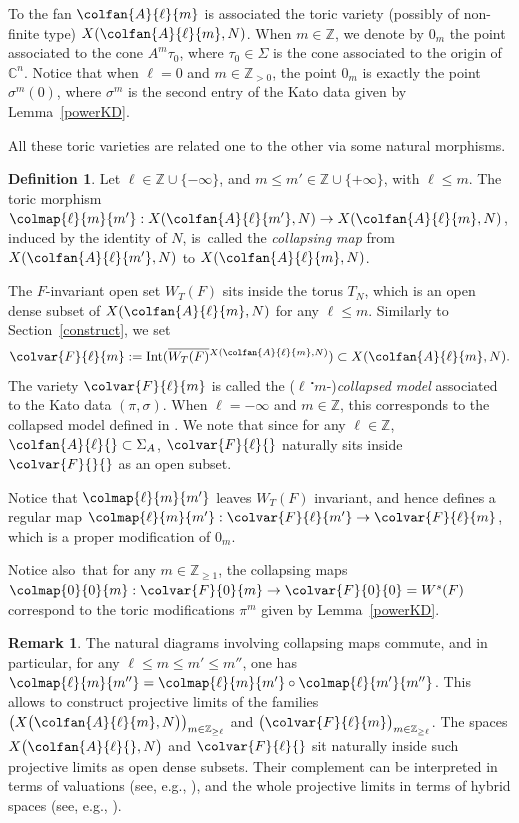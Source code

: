 \documentclass[JEP,XML,SOM,Unicode,NoFloatCountersInSection]{cedram}
\theoremstyle{definition}
\newtheorem{definition}[theorem]{Definition}
\newtheorem{remark}[theorem]{Remark}
\let\ov\overline
\newcommand{\CC}{\mathbb{C}}
\newcommand{\ZZ}{\mathbb{Z}}
\DeclareMathOperator{\Int}{Int}
\begin{document}
To the fan $\colfan{A}{\ell}{m}$ is associated the toric variety (possibly of non-finite type) $X(\colfan{A}{\ell}{m},N)$.
When $m \in \ZZ$, we denote by $0_m$ the point associated to the cone $A^m \tau_0$, where $\tau_0 \in \Sigma$ is the cone associated to the origin of $\CC^n$.
Notice that when $\ell=0$ and $m \in \ZZ_{>0}$, the point $0_m$ is exactly the point $\sigma^m(0)$, where $\sigma^m$ is the second entry of the Kato data given by Lemma~\ref{powerKD}.

All these toric varieties are related one to the other via some natural morphisms.

\begin{definition}
Let $\ell \in \ZZ \cup \{-\infty\}$, and $m \leq m' \in \ZZ \cup \{+\infty\}$, with $\ell \leq m$.
The toric morphism $\colmap{\ell}{m}{m'}:X(\colfan{A}{\ell}{m'},N) \to X(\colfan{A}{\ell}{m},N)$, induced by the identity of $N$, is~called the \emph{collapsing map} from $X(\colfan{A}{\ell}{m'},N)$ to $X(\colfan{A}{\ell}{m},N)$.
\end{definition}

The $F$-invariant open set $W_T(F)$ sits inside the torus $T_N$, which is an open dense subset of $X(\colfan{A}{\ell}{m},N)$ for any $\ell \leq m$.
Similarly to Section~\ref{construct}, we set
\begin{equation*}
\colvar{F}{\ell}{m}:=\Int(\ov{W_T(F)}{}^{X(\colfan{A}{\ell}{m},N)})\subset X(\colfan{A}{\ell}{m},N).
\end{equation*}
The variety $\colvar{F}{\ell}{m}$ is called the ($\ell\,{}^\centerdot m$-)\emph{collapsed model} associated to the Kato data $(\pi,\sigma)$.
When $\ell=-\infty$ and $m \in \ZZ$, this corresponds to the collapsed model defined in \cite[Chap.\,I.3]{dl84}. We note that since for any $\ell \in \ZZ$, $\colfan{A}{\ell}{}\subset \Sigma_A$, $\colvar{F}{\ell}{}$ naturally sits inside $\colvar{F}{}{}$ as an open subset.

Notice that $\colmap{\ell}{m}{m'}$ leaves $W_T(F)$ invariant, and hence defines a regular map $\colmap{\ell}{m}{m'}:\colvar{F}{\ell}{m'} \to \colvar{F}{\ell}{m}$, which is a proper modification of $0_m$.

Notice also~that for any $m \in \ZZ_{\geq 1}$, the collapsing maps $\colmap{0}{0}{m}:\colvar{F}{0}{m} \to \colvar{F}{0}{0} =W^s(F)$ correspond to the toric modifications $\pi^m$ given by Lemma~\ref{powerKD}.

\begin{remark}\label{rmk:collapsinginversesystem}
The natural diagrams involving collapsing maps commute, and in particular, for any $\ell \leq m \leq m' \leq m''$, one has $\colmap{\ell}{m}{m''} = \colmap{\ell}{m}{m'} \circ \colmap{\ell}{m'}{m''}$.
This allows to construct projective limits of the families $\big(X\big(\colfan{A}{\ell}{m},N\big)\big)_{m \in \ZZ_{\geq \ell}}$ and $\big(\colvar{F}{\ell}{m}\big)_{m \in \ZZ_{\geq \ell}}$.
The spaces $X\big(\colfan{A}{\ell}{},N\big)$ and $\colvar{F}{\ell}{}$ sit naturally inside such projective limits as open dense subsets.
Their complement can be interpreted in terms of valuations (see, e.g., \cite{teissier}), and the whole projective limits in terms of hybrid spaces (see, e.g., \cite{berkovich, boucksom-jonsson, favre}).
\end{remark}
\end{document}

